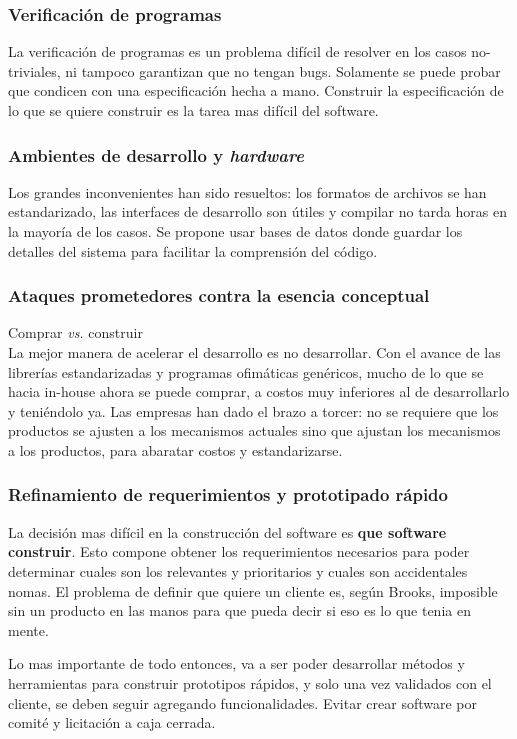\documentclass{beamer}
\begin{document}
\begin{frame}[fragile]
  \frametitle{Verificaci\'on de programas}
  La verificaci\'on de programas es un problema dif\'icil de resolver en los casos
  no-triviales, ni tampoco garantizan que no tengan bugs. Solamente se puede
  probar que condicen con una especificaci\'on hecha a mano. Construir la especificaci\'on
  de lo que se quiere construir es la tarea mas dif\'icil del software.
\end{frame}

\begin{frame}[fragile]
  \frametitle{Ambientes de desarrollo y \textit{hardware}}
  Los grandes inconvenientes han sido resueltos: los formatos de archivos se han
  estandarizado, las interfaces de desarrollo son \'utiles y compilar no tarda horas en
  la mayor\'ia de los casos. Se propone usar bases de datos donde guardar los detalles
  del sistema para facilitar la comprensi\'on del c\'odigo.
\end{frame}


\begin{frame}[fragile]
  \frametitle{Ataques prometedores contra la esencia conceptual}
  Comprar \textit{vs.} construir \\
  La mejor manera de acelerar el desarrollo es no desarrollar. Con el avance de las
  librer\'ias estandarizadas y programas ofim\'aticas gen\'ericos, mucho de lo que se hacia
  in-house ahora se puede comprar, a costos muy inferiores al de desarrollarlo y teni\'endolo
  ya. Las empresas han dado el brazo a torcer: no se requiere que los productos se ajusten a
  los mecanismos actuales sino que ajustan los mecanismos a los productos, para abaratar costos
  y estandarizarse.
\end{frame}


\begin{frame}[fragile]
  \frametitle{Refinamiento de requerimientos y prototipado r\'apido}
  La decisi\'on mas dif\'icil en la construcci\'on del software es \textbf{que software construir}. Esto
  compone obtener los requerimientos necesarios para poder determinar cuales son los relevantes y
  prioritarios y cuales son accidentales nomas. El problema de definir que quiere un cliente
  es, seg\'un Brooks, imposible sin un producto en las manos para que pueda decir si eso es lo
  que tenia en mente.

  Lo mas importante de todo entonces, va a ser poder desarrollar m\'etodos y herramientas para
  construir prototipos r\'apidos, y solo una vez validados con el cliente, se deben seguir
  agregando funcionalidades. Evitar crear software por comit\'e y licitaci\'on a caja cerrada.
\end{frame}
\end{document}
